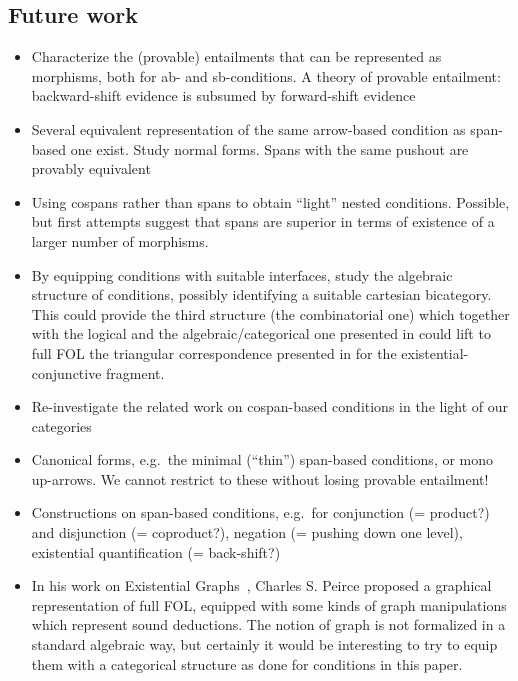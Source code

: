 \subsection{Future work}

\begin{itemize}
\item Characterize the (provable) entailments that can be represented as morphisms, both for ab- and sb-conditions. A theory of provable entailment: backward-shift evidence is subsumed by forward-shift evidence
\item Several equivalent representation of the same arrow-based condition as span-based one exist. Study normal forms. Spans with the same pushout are provably equivalent
\item Using cospans rather than spans to obtain ``light'' nested conditions. Possible, but first attempts suggest that spans are superior in terms of existence of a larger number of morphisms.
\item By equipping conditions with suitable interfaces, study the algebraic structure of conditions, possibly identifying a suitable cartesian bicategory. This could provide the third structure (the combinatorial one) which together with the logical and the algebraic/categorical one presented in \cite{DBLP:journals/corr/abs-2404-18795} could lift to full FOL the triangular correspondence presented in \cite{DBLP:conf/csl/BonchiSS18} for the existential-conjunctive fragment.
\item Re-investigate the related work on cospan-based conditions in the light of our categories
\item Canonical forms, e.g.\ the minimal (``thin'') span-based conditions, or mono up-arrows. We cannot restrict to these without losing provable entailment!
\item Constructions on span-based conditions, e.g.\ for conjunction (= product?) and disjunction (= coproduct?), negation (= pushing down one level), existential quantification (= back-shift?)
\item In his work on Existential Graphs~\cite{roberts1973-the-existential-graphs-of-charles-s.-peirce}, Charles S. Peirce proposed a graphical representation of full FOL, equipped with some kinds of graph manipulations which represent sound deductions. The notion of graph is not formalized in a standard algebraic way, but certainly it would be interesting to try to equip them with a categorical structure as done for conditions in this paper.  
\end{itemize}
